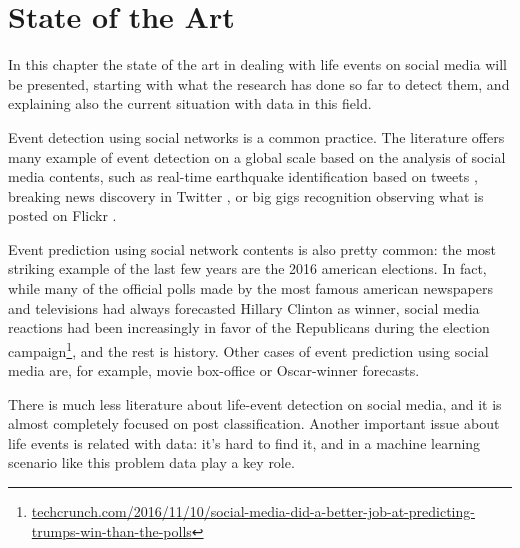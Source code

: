 \chapter{State of the Art}
\label{cha:soa}

In this chapter the state of the art in dealing with life events on social media will be presented, starting with what the research has done so far to detect them, and explaining also the current situation with data in this field.

Event detection using social networks is a common practice. The literature offers many example of event detection on a global scale based on the analysis of social media contents, such as real-time earthquake identification based on tweets \cite{sakaki2010earthquake}, breaking news discovery in Twitter \cite{jackoway2011identification, phuvipadawat2010breaking}, or big gigs recognition observing what is posted on Flickr \cite{liu2011using}.

Event prediction using social network contents is also pretty common: the most striking example of the last few years are the 2016 american elections. In fact, while many of the official polls made by the most famous american newspapers and televisions had always forecasted Hillary Clinton as winner, social media reactions had been increasingly in favor of the Republicans during the election campaign\footnote{\url{techcrunch.com/2016/11/10/social-media-did-a-better-job-at-predicting-trumps-win-than-the-polls}}, and the rest is history. Other cases of event prediction using social media are, for example, movie box-office \cite{asur2010predicting} or Oscar-winner forecasts.

There is much less literature about life-event detection on social media, and it is almost completely focused on post classification. Another important issue about life events is related with data: it's hard to find it, and in a machine learning scenario like this problem data play a key role.


